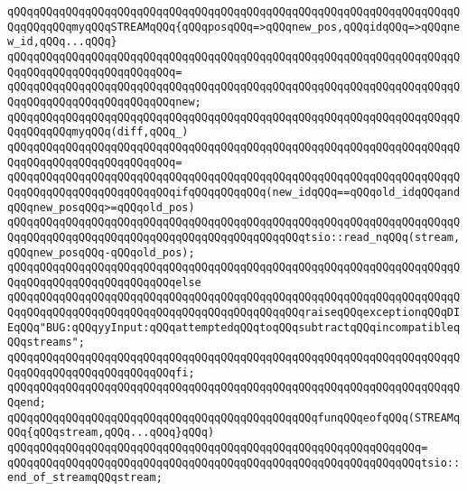 \newline
\verb|qQQqqQQqqQQqqQQqqQQqqQQqqQQqqQQqqQQqqQQqqQQqqQQqqQQqqQQqqQQqqQQqqQQqqQQqqQQqqQQqmyqQQqSTREAMqQQq{qQQqposqQQq=>qQQqnew_pos,qQQqidqQQq=>qQQqnew_id,qQQq...qQQq}|\newline
\verb|qQQqqQQqqQQqqQQqqQQqqQQqqQQqqQQqqQQqqQQqqQQqqQQqqQQqqQQqqQQqqQQqqQQqqQQqqQQqqQQqqQQqqQQqqQQqqQQq=|\newline
\verb|qQQqqQQqqQQqqQQqqQQqqQQqqQQqqQQqqQQqqQQqqQQqqQQqqQQqqQQqqQQqqQQqqQQqqQQqqQQqqQQqqQQqqQQqqQQqqQQqnew;|\newline
\newline
\verb|qQQqqQQqqQQqqQQqqQQqqQQqqQQqqQQqqQQqqQQqqQQqqQQqqQQqqQQqqQQqqQQqqQQqqQQqqQQqqQQqmyqQQq(diff,qQQq_)|\newline
\verb|qQQqqQQqqQQqqQQqqQQqqQQqqQQqqQQqqQQqqQQqqQQqqQQqqQQqqQQqqQQqqQQqqQQqqQQqqQQqqQQqqQQqqQQqqQQqqQQq=|\newline
\verb|qQQqqQQqqQQqqQQqqQQqqQQqqQQqqQQqqQQqqQQqqQQqqQQqqQQqqQQqqQQqqQQqqQQqqQQqqQQqqQQqqQQqqQQqqQQqqQQqifqQQqqQQqqQQq(new_idqQQq==qQQqold_idqQQqandqQQqnew_posqQQq>=qQQqold_pos)|\newline
\newline
\verb|qQQqqQQqqQQqqQQqqQQqqQQqqQQqqQQqqQQqqQQqqQQqqQQqqQQqqQQqqQQqqQQqqQQqqQQqqQQqqQQqqQQqqQQqqQQqqQQqqQQqqQQqqQQqqQQqqQQqtsio::read_nqQQq(stream,qQQqnew_posqQQq-qQQqold_pos);|\newline
\verb|qQQqqQQqqQQqqQQqqQQqqQQqqQQqqQQqqQQqqQQqqQQqqQQqqQQqqQQqqQQqqQQqqQQqqQQqqQQqqQQqqQQqqQQqqQQqqQQqelse|\newline
\verb|qQQqqQQqqQQqqQQqqQQqqQQqqQQqqQQqqQQqqQQqqQQqqQQqqQQqqQQqqQQqqQQqqQQqqQQqqQQqqQQqqQQqqQQqqQQqqQQqqQQqqQQqqQQqqQQqqQQqraiseqQQqexceptionqQQqDIEqQQq"BUG:qQQqyyInput:qQQqattemptedqQQqtoqQQqsubtractqQQqincompatibleqQQqstreams";|\newline
\verb|qQQqqQQqqQQqqQQqqQQqqQQqqQQqqQQqqQQqqQQqqQQqqQQqqQQqqQQqqQQqqQQqqQQqqQQqqQQqqQQqqQQqqQQqqQQqqQQqfi;|\newline
\newline
\verb|qQQqqQQqqQQqqQQqqQQqqQQqqQQqqQQqqQQqqQQqqQQqqQQqqQQqqQQqqQQqqQQqqQQqqQQqend;|\newline
\newline
\verb|qQQqqQQqqQQqqQQqqQQqqQQqqQQqqQQqqQQqqQQqqQQqqQQqfunqQQqeofqQQq(STREAMqQQq{qQQqstream,qQQq...qQQq}qQQq)|\newline
\verb|qQQqqQQqqQQqqQQqqQQqqQQqqQQqqQQqqQQqqQQqqQQqqQQqqQQqqQQqqQQqqQQq=|\newline
\verb|qQQqqQQqqQQqqQQqqQQqqQQqqQQqqQQqqQQqqQQqqQQqqQQqqQQqqQQqqQQqqQQqtsio::end_of_streamqQQqstream;|\newline

